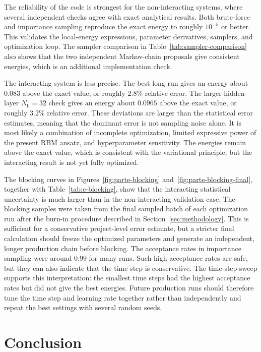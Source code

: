 \documentclass[10pt,a4paper]{article}
\newcommand{\Nh}{N_{\mathrm{h}}}
\begin{document}
The reliability of the code is strongest for the non-interacting systems, where several independent checks agree with exact analytical results. Both brute-force and importance sampling reproduce the exact energy to roughly $10^{-5}$ or better. This validates the local-energy expressions, parameter derivatives, samplers, and optimization loop. The sampler comparison in Table~\ref{tab:sampler-comparison} also shows that the two independent Markov-chain proposals give consistent energies, which is an additional implementation check.

The interacting system is less precise. The best long run gives an energy about $0.083$ above the exact value, or roughly $2.8\%$ relative error. The larger-hidden-layer $\Nh=32$ check gives an energy about $0.0965$ above the exact value, or roughly $3.2\%$ relative error. These deviations are larger than the statistical error estimates, meaning that the dominant error is not sampling noise alone. It is most likely a combination of incomplete optimization, limited expressive power of the present RBM ansatz, and hyperparameter sensitivity. The energies remain above the exact value, which is consistent with the variational principle, but the interacting result is not yet fully optimized.

The blocking curves in Figures~\ref{fig:parte-blocking} and~\ref{fig:parte-blocking-final}, together with Table~\ref{tab:e-blocking}, show that the interacting statistical uncertainty is much larger than in the non-interacting validation case. The blocking samples were taken from the final sampled batch of each optimization run after the burn-in procedure described in Section~\ref{sec:methodology}. This is sufficient for a conservative project-level error estimate, but a stricter final calculation should freeze the optimized parameters and generate an independent, longer production chain before blocking. The acceptance rates in importance sampling were around $0.99$ for many runs. Such high acceptance rates are safe, but they can also indicate that the time step is conservative. The time-step sweep supports this interpretation: the smallest time steps had the highest acceptance rates but did not give the best energies. Future production runs should therefore tune the time step and learning rate together rather than independently and repeat the best settings with several random seeds.

\section{Conclusion}\label{sec:conclusion}
\end{document}
